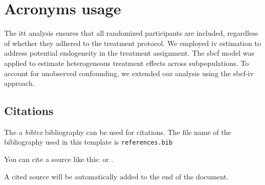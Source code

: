 \section{Acronyms usage}\label{acronyms-usage}

The \acrshort{itt} analysis ensures that all randomized participants are
included, regardless of whether they adhered to the treatment protocol.
We employed \acrshort{iv} estimation to address potential endogeneity in
the treatment assignment. The \acrshort{sbcf} model was applied to
estimate heterogeneous treatment effects across subpopulations. To
account for unobserved confounding, we extended our analysis using the
\acrshort{sbcf-iv} approach.

\pagebreak

\subsection{Citations}\label{citations}

The a \emph{bibtex} bibliography can be used for citations. The file
name of the bibliography used in this template is
\texttt{references.bib}

You can cite a source like this: \autocite{Keil_2012} or
\textcite{Litterman1986}.

A cited source will be automatically added to the end of the document.



\renewcommand*{\mkbibnamefamily}[1]{\textbf{#1}}
\renewcommand*{\mkbibnamegiven}[1]{\textbf{#1}}
\renewcommand*{\mkbibnameprefix}[1]{\textbf{#1}}
\renewcommand*{\mkbibnamesuffix}[1]{\textbf{#1}}
\printbibliography[title=References]




